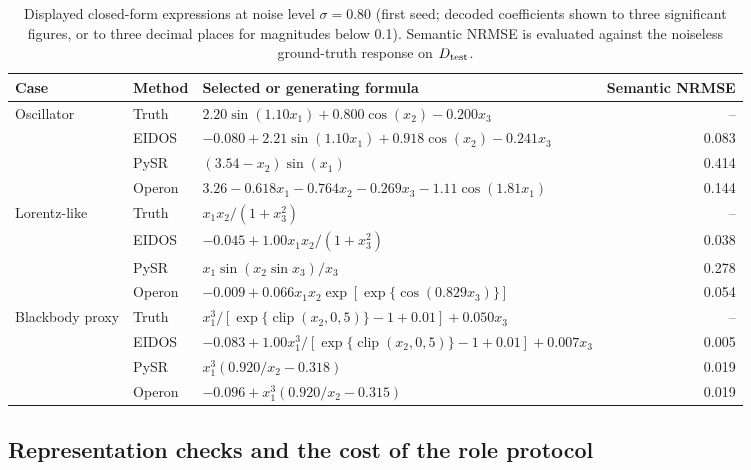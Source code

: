 \begin{table}[t]
\def\baselinestretch{1}\selectfont
\caption{Displayed closed-form expressions at noise level \(\sigma=0.80\) (first seed; decoded coefficients shown to three significant figures, or to three decimal places for magnitudes below 0.1). Semantic NRMSE is evaluated against the noiseless ground-truth response on \(D_{\rm test}\).}\label{tab:formulaexamples}
\centering
\scriptsize
\setlength{\tabcolsep}{3.5pt}
\renewcommand{\arraystretch}{1.13}
\begin{tabularx}{\textwidth}{@{}>{\raggedright\arraybackslash}p{}>{\raggedright\arraybackslash}p{}>{\raggedright\arraybackslash}Xr@{}}
\toprule
\textbf{Case} & \textbf{Method} & \textbf{Selected or generating formula} & \textbf{Semantic NRMSE} \\
\midrule
Oscillator & Truth & \(2.20\sin(1.10x_1)+0.800\cos(x_2)-0.200x_3\) & -- \\
& EIDOS & \(-0.080+2.21\sin(1.10x_1)+0.918\cos(x_2)-0.241x_3\) & 0.083 \\
& PySR & \((3.54-x_2)\sin(x_1)\) & 0.414 \\
& Operon & \(3.26-0.618x_1-0.764x_2-0.269x_3-1.11\cos(1.81x_1)\) & 0.144 \\
\addlinespace
Lorentz-like & Truth & \(x_1x_2/(1+x_3^2)\) & -- \\
& EIDOS & \(-0.045+1.00x_1x_2/(1+x_3^2)\) & 0.038 \\
& PySR & \(x_1\sin(x_2\sin x_3)/x_3\) & 0.278 \\
& Operon & \(-0.009+0.066x_1x_2\exp[\exp\{\cos(0.829x_3)\}]\) & 0.054 \\
\addlinespace
Blackbody proxy & Truth & \(x_1^3/[\exp\{\operatorname{clip}(x_2,0,5)\}-1+0.01]+0.050x_3\) & -- \\
& EIDOS & \(-0.083+1.00x_1^3/[\exp\{\operatorname{clip}(x_2,0,5)\}-1+0.01]+0.007x_3\) & 0.005 \\
& PySR & \(x_1^3(0.920/x_2-0.318)\) & 0.019 \\
& Operon & \(-0.096+x_1^3(0.920/x_2-0.315)\) & 0.019 \\
\bottomrule
\end{tabularx}
\end{table}

\subsection{Representation checks and the cost of the role protocol}\label{sec:representationchecks}


